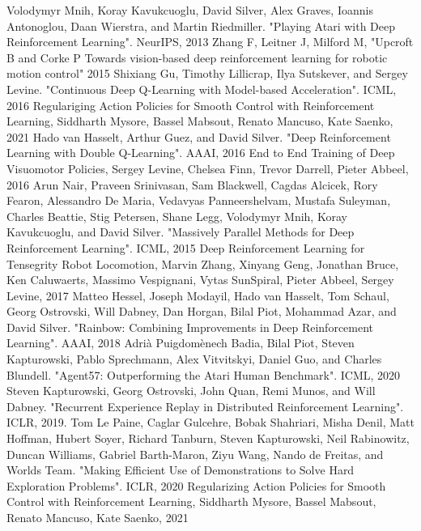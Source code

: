 \documentclass[a4j, twocolumn, 10pt,pdflatex,ja=standard]{bxjsarticle}
\begin{document}
\begin{thebibliography}{99}
 Volodymyr Mnih, Koray Kavukcuoglu, David Silver, Alex Graves, Ioannis Antonoglou, Daan Wierstra, and Martin Riedmiller. "Playing Atari with Deep Reinforcement Learning". NeurIPS, 2013
Zhang F, Leitner J, Milford M, "Upcroft B and Corke P Towards vision-based deep reinforcement learning for robotic motion control" 2015
 Shixiang Gu, Timothy Lillicrap, Ilya Sutskever, and Sergey Levine. "Continuous Deep Q-Learning with Model-based Acceleration". ICML, 2016
 Regulariging Action Policies for Smooth Control with Reinforcement Learning, Siddharth Mysore, Bassel Mabsout, Renato Mancuso, Kate Saenko, 2021
 Hado van Hasselt, Arthur Guez, and David Silver. "Deep Reinforcement Learning with Double Q-Learning". AAAI, 2016
 End to End Training of Deep Visuomotor Policies, Sergey Levine, Chelsea Finn, Trevor Darrell, Pieter Abbeel, 2016
Arun Nair, Praveen Srinivasan, Sam Blackwell, Cagdas Alcicek, Rory Fearon, Alessandro De Maria, Vedavyas Panneershelvam, Mustafa Suleyman, Charles Beattie, Stig Petersen, Shane Legg, Volodymyr Mnih, Koray Kavukcuoglu, and David Silver. "Massively Parallel Methods for Deep Reinforcement Learning". ICML, 2015
 Deep Reinforcement Learning for Tensegrity Robot Locomotion, Marvin Zhang, Xinyang Geng, Jonathan Bruce, Ken Caluwaerts, Massimo Vespignani, Vytas SunSpiral, Pieter Abbeel, Sergey Levine, 2017
 Matteo Hessel, Joseph Modayil, Hado van Hasselt, Tom Schaul, Georg Ostrovski, Will Dabney, Dan Horgan, Bilal Piot, Mohammad Azar, and David Silver. "Rainbow: Combining Improvements in Deep Reinforcement Learning". AAAI, 2018
 Adrià Puigdomènech Badia, Bilal Piot, Steven Kapturowski, Pablo Sprechmann, Alex Vitvitskyi, Daniel Guo, and Charles Blundell. "Agent57: Outperforming the Atari Human Benchmark". ICML, 2020
 Steven Kapturowski, Georg Ostrovski, John Quan, Remi Munos, and Will Dabney. "Recurrent Experience Replay in Distributed Reinforcement Learning". ICLR, 2019.
 Tom Le Paine, Caglar Gulcehre, Bobak Shahriari, Misha Denil, Matt Hoffman, Hubert Soyer, Richard Tanburn, Steven Kapturowski, Neil Rabinowitz, Duncan Williams, Gabriel Barth-Maron, Ziyu Wang, Nando de Freitas, and Worlds Team. "Making Efficient Use of Demonstrations to Solve Hard Exploration Problems". ICLR, 2020
 Regularizing Action Policies for Smooth Control with Reinforcement Learning, Siddharth Mysore, Bassel Mabsout, Renato Mancuso, Kate Saenko, 2021

\end{thebibliography}
\end{document}
